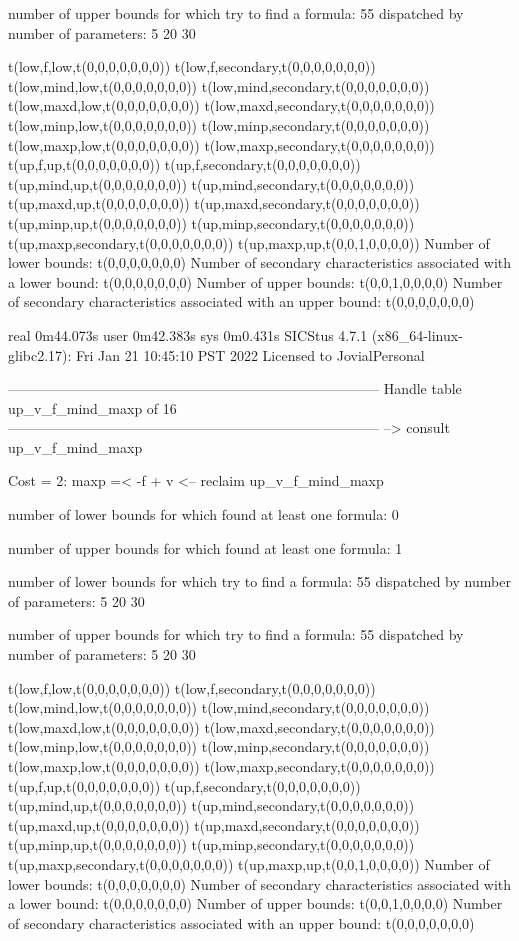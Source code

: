 number of upper bounds for which try to find a formula: 55
dispatched by number of parameters: 5  20  30

t(low,f,low,t(0,0,0,0,0,0,0))
t(low,f,secondary,t(0,0,0,0,0,0,0))
t(low,mind,low,t(0,0,0,0,0,0,0))
t(low,mind,secondary,t(0,0,0,0,0,0,0))
t(low,maxd,low,t(0,0,0,0,0,0,0))
t(low,maxd,secondary,t(0,0,0,0,0,0,0))
t(low,minp,low,t(0,0,0,0,0,0,0))
t(low,minp,secondary,t(0,0,0,0,0,0,0))
t(low,maxp,low,t(0,0,0,0,0,0,0))
t(low,maxp,secondary,t(0,0,0,0,0,0,0))
t(up,f,up,t(0,0,0,0,0,0,0))
t(up,f,secondary,t(0,0,0,0,0,0,0))
t(up,mind,up,t(0,0,0,0,0,0,0))
t(up,mind,secondary,t(0,0,0,0,0,0,0))
t(up,maxd,up,t(0,0,0,0,0,0,0))
t(up,maxd,secondary,t(0,0,0,0,0,0,0))
t(up,minp,up,t(0,0,0,0,0,0,0))
t(up,minp,secondary,t(0,0,0,0,0,0,0))
t(up,maxp,secondary,t(0,0,0,0,0,0,0))
t(up,maxp,up,t(0,0,1,0,0,0,0))
Number of lower bounds:                                             t(0,0,0,0,0,0,0)
Number of secondary characteristics associated with a lower bound:  t(0,0,0,0,0,0,0)
Number of upper bounds:                                             t(0,0,1,0,0,0,0)
Number of secondary characteristics associated with an upper bound: t(0,0,0,0,0,0,0)

real	0m44.073s
user	0m42.383s
sys	0m0.431s
SICStus 4.7.1 (x86_64-linux-glibc2.17): Fri Jan 21 10:45:10 PST 2022
Licensed to JovialPersonal


--------------------------------------------------------------------------------
Handle table up_v_f_mind_maxp of 16
--------------------------------------------------------------------------------
--> consult up_v_f_mind_maxp

Cost =  2:  maxp =< -f + v
<-- reclaim up_v_f_mind_maxp

number of lower bounds for which found at least one formula: 0

number of upper bounds for which found at least one formula: 1

number of lower bounds for which try to find a formula: 55
dispatched by number of parameters: 5  20  30

number of upper bounds for which try to find a formula: 55
dispatched by number of parameters: 5  20  30

t(low,f,low,t(0,0,0,0,0,0,0))
t(low,f,secondary,t(0,0,0,0,0,0,0))
t(low,mind,low,t(0,0,0,0,0,0,0))
t(low,mind,secondary,t(0,0,0,0,0,0,0))
t(low,maxd,low,t(0,0,0,0,0,0,0))
t(low,maxd,secondary,t(0,0,0,0,0,0,0))
t(low,minp,low,t(0,0,0,0,0,0,0))
t(low,minp,secondary,t(0,0,0,0,0,0,0))
t(low,maxp,low,t(0,0,0,0,0,0,0))
t(low,maxp,secondary,t(0,0,0,0,0,0,0))
t(up,f,up,t(0,0,0,0,0,0,0))
t(up,f,secondary,t(0,0,0,0,0,0,0))
t(up,mind,up,t(0,0,0,0,0,0,0))
t(up,mind,secondary,t(0,0,0,0,0,0,0))
t(up,maxd,up,t(0,0,0,0,0,0,0))
t(up,maxd,secondary,t(0,0,0,0,0,0,0))
t(up,minp,up,t(0,0,0,0,0,0,0))
t(up,minp,secondary,t(0,0,0,0,0,0,0))
t(up,maxp,secondary,t(0,0,0,0,0,0,0))
t(up,maxp,up,t(0,0,1,0,0,0,0))
Number of lower bounds:                                             t(0,0,0,0,0,0,0)
Number of secondary characteristics associated with a lower bound:  t(0,0,0,0,0,0,0)
Number of upper bounds:                                             t(0,0,1,0,0,0,0)
Number of secondary characteristics associated with an upper bound: t(0,0,0,0,0,0,0)

